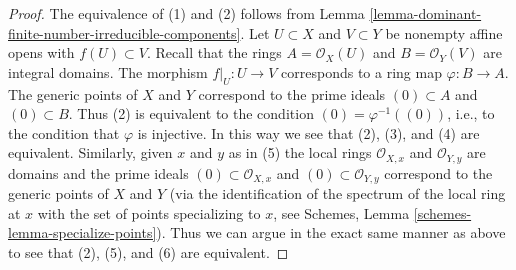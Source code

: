 \documentclass[10pt,a4paper]{amsart}
\theoremstyle{plain}
\theoremstyle{definition}
\theoremstyle{remark}
\numberwithin{equation}{subsection}
\begin{document}
\begin{proof}
The equivalence of (1) and (2) follows from
Lemma \ref{lemma-dominant-finite-number-irreducible-components}.
Let $U \subset X$ and $V \subset Y$ be nonempty affine opens with
$f(U) \subset V$. Recall that the rings $A = \mathcal{O}_X(U)$
and $B = \mathcal{O}_Y(V)$ are integral domains.
The morphism $f|_U : U \to V$ corresponds to a ring map
$\varphi : B \to A$. The generic points of $X$ and $Y$ correspond
to the prime ideals $(0) \subset A$ and $(0) \subset B$. Thus
(2) is equivalent to the condition $(0) = \varphi^{-1}((0))$,
i.e., to the condition that $\varphi$ is injective.
In this way we see that (2), (3), and (4) are equivalent.
Similarly, given $x$ and $y$ as in (5) the local rings
$\mathcal{O}_{X, x}$ and $\mathcal{O}_{Y, y}$ are domains
and the prime ideals $(0) \subset \mathcal{O}_{X, x}$
and $(0) \subset \mathcal{O}_{Y, y}$ correspond to the
generic points of $X$ and $Y$ (via the identification of
the spectrum of the local ring at $x$
with the set of points specializing to $x$, see
Schemes, Lemma \ref{schemes-lemma-specialize-points}).
Thus we can argue in the exact same manner as above
to see that (2), (5), and (6) are equivalent.
\end{proof}
\end{document}
